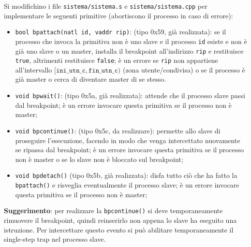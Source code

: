 Si modifichino i file \verb|sistema/sistema.s| e \verb|sistema/sistema.cpp| per implementare le seguenti primitive
(abortiscono il processo in caso di errore):
\begin{itemize}
\item 	\verb|bool bpattach(natl id, vaddr rip)|: (tipo 0x59, gi\`a realizzata): 
	se il processo che invoca la primitiva non \`e uno slave e il processo \verb|id| esiste e non \`e gi\`a uno slave o un master,
	installa il breakpoint all'indirizzo \verb|rip| e restituisce \verb|true|, altrimenti restituisce \verb|false|;
        \`e un errore se \verb|rip| non appartiene all'intervallo $[\mathtt{ini\_utn\_c}, \mathtt{fin\_utn\_c})$ (zona utente/condivisa)
	o se il processo \`e gi\`a master o cerca di diventare master di se stesso.
	\item   \verb|void bpwait()|: (tipo 0x5a, gi\`a realizzata): attende che il processo slave passi dal breakpoint;
	\`e un errore invocare questa primitiva se il processo non \`e master;
	\item \verb|void bpcontinue()|: (tipo 0x5c, da realizzare):  permette allo slave di proseguire l'esecuzione, facendo
	in modo che venga intercettato nuovamente se ripassa dal breakpoint; \`e un errore invocare questa primitiva se il
	processo non \`e master o se lo slave non \`e bloccato sul breakpoint;
\item   \verb|void bpdetach()| (tipo 0x5b, gi\`a realizzata): disfa tutto ci\`o che ha fatto la \verb|bpattach()| e risveglia
	eventualmente il processo slave; \`e un errore invocare questa primitiva se il processo non \`e master;
\end{itemize}

{\bf Suggerimento}: per realizzare la \verb|bpcontinue()| si deve temporaneamente rimuovere il breakpoint, quindi
reinserirlo non appena lo slave ha eseguito una istruzione. Per intercettare questo evento si pu\`o abilitare
temporaneamente il single-step trap nel processo slave.
